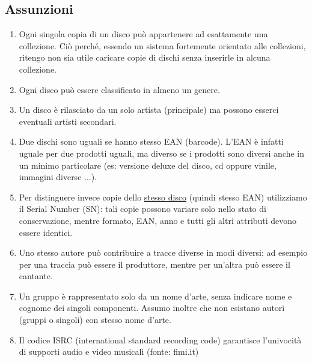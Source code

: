 \documentclass{article}
\begin{document}
\subsection{Assunzioni}
\begin{enumerate}
    \item Ogni singola copia di un disco può appartenere ad esattamente una collezione. Ciò perché, essendo un sistema fortemente orientato alle collezioni, ritengo non sia utile caricare copie di dischi senza inserirle in alcuna collezione.
    \item Ogni disco può essere classificato in almeno un genere.
    \item Un disco è rilasciato da un solo artista (principale) ma possono esserci eventuali artisti secondari.
    \item Due dischi sono uguali se hanno stesso EAN (barcode). L'EAN è infatti uguale per due prodotti uguali, ma diverso se i prodotti sono diversi anche in un minimo particolare (es: versione deluxe del disco, cd oppure vinile, immagini diverse ...).
    \item Per distinguere invece copie dello \underline{stesso disco} (quindi stesso EAN) utilizziamo il Serial Number (SN): tali copie possono variare solo nello stato di conservazione, mentre formato, EAN, anno e tutti gli altri attributi devono essere identici.
    \item Uno stesso autore può contribuire a tracce diverse in modi diversi: ad esempio per una traccia può essere il produttore, mentre per un'altra può essere il cantante.
    \item Un gruppo è rappresentato solo da un nome d'arte, senza indicare nome e cognome dei singoli componenti. Assumo inoltre che non esistano autori (gruppi o singoli) con stesso nome d'arte.
    \item Il codice ISRC (international standard recording code) garantisce l'univocità di supporti audio e video musicali (fonte: fimi.it)
\end{enumerate}
\end{document}
